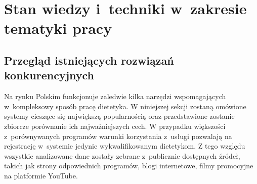 \chapter{Stan wiedzy i~techniki w~zakresie tematyki pracy}\label{ch:knowladge-state}
\section{Przegląd istniejących rozwiązań konkurencyjnych}\label{sec:competitive-solutions}
Na rynku Polskim funkcjonuje zaledwie kilka narzędzi wspomagających w~kompleksowy sposób pracę dietetyka.
W niniejszej sekcji zostaną omówione systemy cieszące się największą popularnością oraz przedstawione zostanie zbiorcze porównanie ich najważniejszych cech.
W przypadku większości z~porównywanych programów warunki korzystania z~usługi pozwalają na rejestrację w~systemie jedynie wykwalifikowanym dietetykom.
Z tego względu wszystkie analizowane dane zostały zebrane z~publicznie dostępnych źródeł, takich jak strony odpowiednich programów, blogi internetowe, filmy promocyjne na platformie YouTube\cite{url:youtube}.
